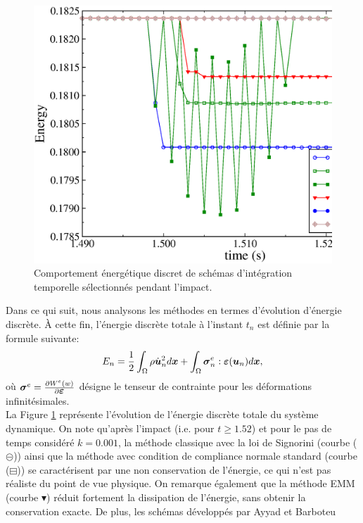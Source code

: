 \vspace*{0.5cm}
\begin{figure}[!h]
	\begin{center}
		\includegraphics[width=15cm]{chapitres/chapitre_2/figures/ene_fr_po_2020.eps}
	\end{center}
	\caption{Comportement énergétique discret de schémas d'intégration temporelle sélectionnés pendant l'impact.}
	\label{ene_ball}
\end{figure}
Dans ce qui suit, nous analysons les méthodes en termes d'évolution d'énergie discrète. À cette fin, l'énergie discrète totale à l'instant $t_{n}$ est définie par la formule suivante:
$$
E_{n} =   \frac{1}{2} \int_{\Omega} \rho \dot{\mbox{\boldmath{$u$}}}^{2}_{n} d\mbox{\boldmath{$x$}} +
\int_{\Omega} {\boldsymbol \sigma}^e_{n} :
\mbox{\boldmath{$\varepsilon$}}(\mbox{\boldmath{$u$}}_{n}) d\mbox{\boldmath{$x$}},
$$
où ${\boldsymbol \sigma}^e= \frac{\partial W^e(w)}{\partial \mbox{\boldmath{$\varepsilon$}}}$ désigne le tenseur de contrainte pour les déformations infinitésimales.\\
La Figure  \ref{ene_ball} représente l'évolution de l'énergie discrète totale du système dynamique. On note qu'après l'impact (i.e. pour $t \ge 1.52 $) et pour le pas de temps considéré $ k = 0.001 $, la méthode classique avec la loi de Signorini (courbe ( $\circleddash $)) ainsi que la méthode avec condition de compliance normale standard (courbe ($\boxminus$)) se caractérisent par une non conservation de l'énergie, ce qui n'est pas réaliste du point de vue physique. On remarque également que la méthode EMM (courbe $\blacktriangledown$) réduit fortement la dissipation de l'énergie, sans obtenir la conservation exacte. De plus, les schémas développés par Ayyad et Barboteu \cite{ayyad2009formulation}
